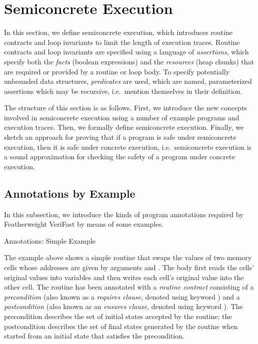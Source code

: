 \documentclass{CSML}
\theoremstyle{definition}\newtheorem{notation}[thm]{Notation}
\theoremstyle{plain}\newtheorem{satz}[thm]{Satz}
\begin{document}
\section{Semiconcrete Execution}\label{sec:scexec}

In this section, we define semiconcrete execution, which introduces 
routine contracts and loop invariants to limit the length of execution 
traces. Routine contracts and loop invariants are specified using a 
language of \emph{assertions}, which specify both the \emph{facts} 
(boolean expressions) and the \emph{resources} (heap chunks) that are 
required or provided by a routine or loop body. To specify potentially 
unbounded data structures, \emph{predicates} are used, which are named, 
parameterized assertions which may be recursive, i.e.~mention themselves 
in their definition. 

The structure of this section is as follows. First, we 
introduce the new concepts involved in semiconcrete execution 
using a number of example programs and execution traces. Then, 
we formally define semiconcrete execution. Finally, we sketch 
an approach for proving that if a program is safe under 
semiconcrete execution, then it is safe under concrete 
execution, i.e.~semiconcrete execution is a sound approximation 
for checking the safety of a program under concrete execution.

\subsection{Annotations by Example}

In this subsection, we introduce the kinds of program annotations required by Featherweight VeriFast by means of some examples.

\begin{exa}{Annotations: Simple Example}



\end{exa}

The example above shows a simple routine  that 
swaps the values of two memory cells whose addresses are given 
by arguments  and . The body 
first reads the cells' original values into variables and then 
writes each cell's original value into the other cell. The 
routine has been annotated with a \emph{routine contract} 
consisting of a \emph{precondition} (also known as a 
\emph{requires clause}, denoted using keyword ) 
and a \emph{postcondition} (also known as an \emph{ensures 
clause}, denoted using keyword ). The 
precondition describes the set of initial states accepted by 
the routine; the postcondition describes the set of final 
states generated by the routine when started from an initial 
state that satisfies the precondition.
\end{document}
